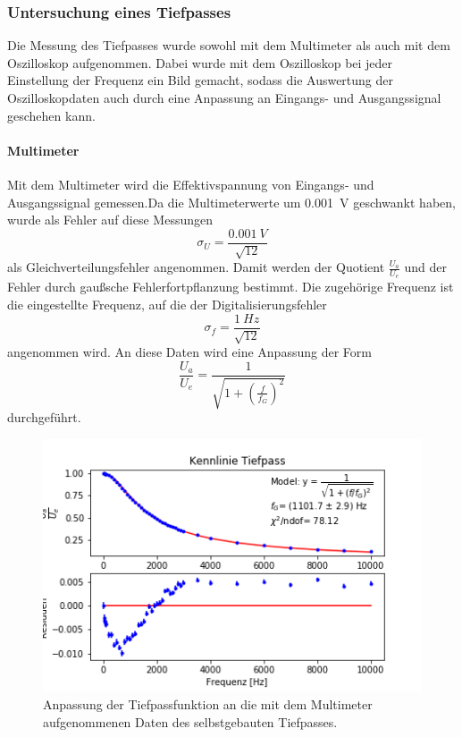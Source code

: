 \documentclass[12pt,a4paper]{article}
\begin{document}
\subsubsection{Untersuchung eines Tiefpasses}
Die Messung des Tiefpasses wurde sowohl mit dem Multimeter als auch mit dem Oszilloskop aufgenommen. Dabei wurde mit dem Oszilloskop bei jeder Einstellung der Frequenz ein Bild gemacht, sodass die Auswertung der Oszilloskopdaten auch durch eine Anpassung an Eingangs- und Ausgangssignal geschehen kann. 

\paragraph{Multimeter}
Mit dem Multimeter wird die Effektivspannung von Eingangs- und Ausgangssignal gemessen.Da die Multimeterwerte um \SI{0,001}{V} geschwankt haben, wurde als Fehler auf diese Messungen
\begin{equation*}
\sigma _U = \dfrac{\SI{0,001}{V}}{\sqrt{12}}
\end{equation*}
als Gleichverteilungsfehler angenommen. Damit werden der Quotient $\frac{U_a}{U_e}$ und der Fehler durch gaußsche Fehlerfortpflanzung bestimmt. Die zugehörige Frequenz ist die eingestellte Frequenz, auf die der Digitalisierungsfehler
\begin{equation*}
\sigma _f = \dfrac{\SI{1}{Hz}}{\sqrt{12}}
\end{equation*}
angenommen wird. An diese Daten wird eine Anpassung der Form 
\begin{equation}
\dfrac{U_a}{U_e} = \dfrac{1}{\sqrt{1 + \left( \frac{f}{f_G} \right)^2}}
\label{eq:TiefpassFunktion}
\end{equation}
durchgeführt. 

\begin{figure}
\centering
\includegraphics[scale=1]{Bilder/Vorversuch1/TiefpassMulti.png}
\caption[test]{Anpassung der Tiefpassfunktion an die mit dem Multimeter aufgenommenen Daten des selbstgebauten Tiefpasses.}
\label{fig:Tiefpass_Multi}
\end{figure}
\end{document}

